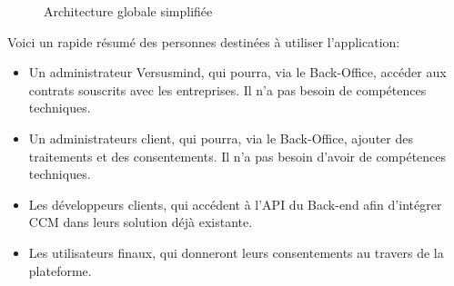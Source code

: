 \documentclass[12pt, a4paper]{report}
\begin{document}
\begin{figure}[H]
\begin{center}
            \end{center}
            \caption{Architecture globale simplifiée}
        \end{figure}
        Voici un rapide résumé des personnes destinées à utiliser l'application:
        \begin{itemize}
            \item Un administrateur Versusmind, qui pourra, via le Back-Office, accéder aux contrats souscrits avec les entreprises. Il n'a pas besoin de compétences techniques.
            \item Un administrateurs client, qui pourra, via le Back-Office, ajouter des traitements et des consentements. Il n'a pas besoin d'avoir de compétences techniques.
            \item Les développeurs clients, qui accédent à l'API du Back-end afin d'intégrer CCM dans leurs solution déjà existante.
            \item Les utilisateurs finaux, qui donneront leurs consentements au travers de la plateforme.
        \end{itemize}
\end{document}
